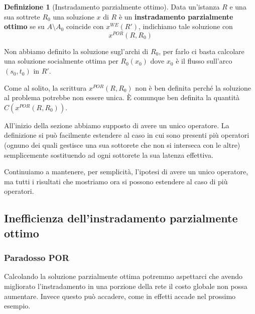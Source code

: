 \documentclass[a4paper]{article}
\theoremstyle{plain}
\theoremstyle{definition}
\newtheorem{mydef}[myteo]{Definizione}
\theoremstyle{remark}
\newcommand{\pa}[1]{\left(#1\right)}
\begin{document}
\begin{mydef}[Instradamento parzialmente ottimo]
  Data un'istanza $R$ e una sua sottrete $R_0$ una soluzione $x$ di
  $R$ è un \textbf{instradamento parzialmente ottimo} se su
  $A\setminus A_0$ coincide con $x^{WE}(R')$, indichiamo tale
  soluzione con
  \[ x^{POR}(R,R_0) \]
\end{mydef}

Non abbiamo definito la soluzione sugl'archi di $R_0$, per farlo ci
basta calcolare una soluzione socialmente ottima per $R_0\pa{x_0}$
dove $x_0$ è il flusso sull'arco $\pa{s_0,t_0}$ in $R'$.

Come al solito, la scrittura $x^{POR}\pa{R,R_0}$ non è ben definita
perché la soluzione al problema potrebbe non essere unica. È comunque
ben definita la quantità $C\pa{x^{POR}\pa{R,R_0}}$.

All'inizio della sezione abbiamo supposto di avere un unico operatore.
La definizione si può facilmente estendere al caso in cui sono
presenti più operatori (ognuno dei quali gestisce una sua sottorete
che non si interseca con le altre) semplicemente sostituendo ad ogni
sottorete la sua latenza effettiva.

Continuiamo a mantenere, per semplicità, l'ipotesi di avere un unico
operatore, ma tutti i risultati che mostriamo ora si possono estendere
al caso di più operatori.

\subsection{Inefficienza dell'instradamento parzialmente ottimo}
\label{sec:inefficienza-por}

\subsubsection{Paradosso POR}
\label{sec:paradosso-por}

Calcolando la soluzione parzialmente ottima potremmo aspettarci che
avendo migliorato l'instradamento in una porzione della rete il costo
globale non possa aumentare. Invece questo può accadere, come in
effetti accade nel prossimo esempio.
\end{document}
